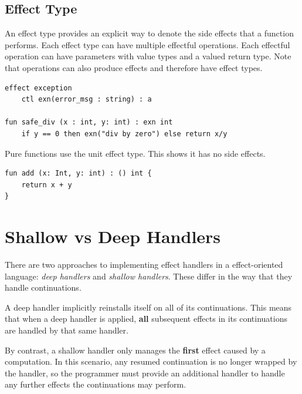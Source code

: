 \documentclass[logo,bsc,singlespacing,parskip]{infthesis}
\begin{document}




\subsection{Effect Type}
An effect type provides an explicit way to denote the side effects that a function performs. Each effect type can have multiple effectful operations. Each effectful operation can have parameters with value types and a valued return type. Note that operations can also produce effects and therefore have effect types.

\begin{lstlisting}
effect exception
    ctl exn(error_msg : string) : a 

fun safe_div (x : int, y: int) : exn int
    if y == 0 then exn("div by zero") else return x/y
\end{lstlisting}

Pure functions use the unit effect type. This shows it has no side effects. 

\begin{lstlisting}
fun add (x: Int, y: int) : () int {
	return x + y
}
\end{lstlisting}

\section{Shallow vs Deep Handlers}
There are two approaches to implementing effect handlers in a effect-oriented language: \textit{deep handlers} and \textit{shallow handlers}. These differ in the way that they handle continuations.

A deep handler  implicitly reinstalls itself on all of its continuations. This means that when a deep handler is applied, \textbf{all} subsequent effects in its continuations are handled by that same handler\cite{hillerstrom_foundations_nodate}. 

By contrast, a shallow handler \cite{ryu_shallow_2018} only manages the \textbf{first} effect caused by a computation. In this scenario, any resumed continuation is no longer wrapped by the handler, so the programmer must provide an additional handler to handle any further effects the continuations may perform.
\end{document}
